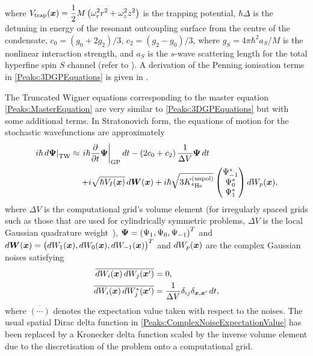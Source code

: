 where $\displaystyle V_\text{trap}(\bm{x}) = \frac{1}{2} M \left(\omega_r^2 r^2 + \omega_z^2 z^2 \right)$ is the trapping potential, $\hbar \Delta$ is the detuning in energy of the resonant outcoupling surface from the centre of the condensate, $c_0 = (g_0 + 2 g_2)/3$, $c_2 = (g_2 - g_0)/3$, where $g_S = 4 \pi \hbar^2 a_S/M$ is the nonlinear interaction strength, and $a_S$ is the $s$-wave scattering length for the total hyperfine spin $S$ channel (refer to ). A derivation of the Penning ionisation terms in \eqref{Peaks:3DGPEquations} is given in .

The Truncated Wigner equations corresponding to the master equation \eqref{Peaks:MasterEquation} are very similar to \eqref{Peaks:3DGPEquations} but with some additional terms. In Stratonovich form, the equations of motion for the stochastic wavefunctions are approximately
\begin{align}
    \label{Peaks:3DTWEquations}
    \begin{split}
        \left. i \hbar \,d\vect{\Psi}\right|_\text{TW} &\approx \left. i \hbar \frac{\partial }{\partial t}\vect{\Psi}\right|_\text{GP} dt - \left(2 c_0 + c_2 \right)\frac{1}{\Delta V}\vect{\Psi}\, dt\\
        &\relphantom{\approx} + i\sqrt{ \hbar V_I(\vect{x})} \,d\vect{W}(\vect{x}) + i \hbar\sqrt{3 \Kunpol}
        \begin{pmatrix}
            \Psi_{-1}^*\\
            \Psi_0^*\\
            \Psi_1^*
        \end{pmatrix} dW_p(\vect{x}),
    \end{split}
\end{align}
where $\Delta V$ is the computational grid's volume element (for irregularly spaced grids such as those that are used for cylindrically symmetric problems, $\Delta V$ is the local Gaussian quadrature weight~\citep{Ronen:2006}), $\bm{\Psi} = \left(\Psi_1, \Psi_0, \Psi_{-1} \right)^T$ and $d \bm{W}(\bm{x}) = \big(dW_1(\bm{x}), dW_0(\bm{x}), dW_{-1}(\bm{x})\big)^T$ and $dW_p(\bm{x})$ are the complex Gaussian noises satisfying
\begin{align}
    \overline{dW_i(\vect{x})\, dW_j(\vect{x}')} &= 0, \\
    \overline{dW_i(\vect{x})\, dW_j^*(\vect{x}')} &= \frac{1}{\Delta V}\delta_{ij}\delta_{\vect{x},\vect{x}'}\,dt, \label{Peaks:ComplexNoiseExpectationValue}
\end{align}
where $\overline{(\cdots)}$ denotes the expectation value taken with respect to the noises. The usual spatial Dirac delta function in \eqref{Peaks:ComplexNoiseExpectationValue} has been replaced by a Kronecker delta function scaled by the inverse volume element due to the discretisation of the problem onto a computational grid.

